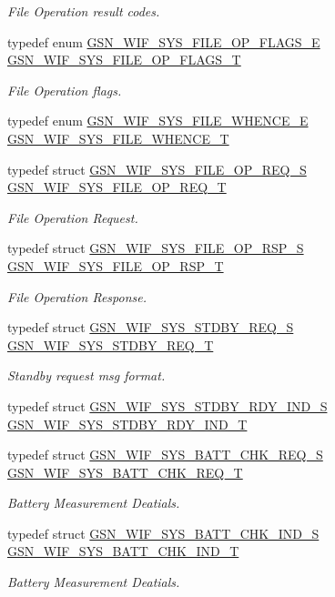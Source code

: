 \begin{DoxyCompactItemize}
\begin{DoxyCompactList}\small\item\em File Operation result codes. \end{DoxyCompactList}\item 
typedef enum \hyperlink{a00639_gac5b276b2a9ea66f27afb0f35e0e75257}{GSN\_\-WIF\_\-SYS\_\-FILE\_\-OP\_\-FLAGS\_\-E} \hyperlink{a00639_ga7719428a1c7dead37acbe115df44fad9}{GSN\_\-WIF\_\-SYS\_\-FILE\_\-OP\_\-FLAGS\_\-T}
\begin{DoxyCompactList}\small\item\em File Operation flags. \end{DoxyCompactList}\item 
typedef enum \hyperlink{a00612_a7df5e29e60c1b277e846cfb371ab25f0}{GSN\_\-WIF\_\-SYS\_\-FILE\_\-WHENCE\_\-E} \hyperlink{a00612_abd4fe8ad19cc5a4a9f488b23b08afbd3}{GSN\_\-WIF\_\-SYS\_\-FILE\_\-WHENCE\_\-T}
\item 
typedef struct \hyperlink{a00350}{GSN\_\-WIF\_\-SYS\_\-FILE\_\-OP\_\-REQ\_\-S} \hyperlink{a00639_ga1808a8f4a69150d0761c6d965d5527d0}{GSN\_\-WIF\_\-SYS\_\-FILE\_\-OP\_\-REQ\_\-T}
\begin{DoxyCompactList}\small\item\em File Operation Request. \end{DoxyCompactList}\item 
typedef struct \hyperlink{a00351}{GSN\_\-WIF\_\-SYS\_\-FILE\_\-OP\_\-RSP\_\-S} \hyperlink{a00639_gace03eed872f0520e74fbcb1eb8faa065}{GSN\_\-WIF\_\-SYS\_\-FILE\_\-OP\_\-RSP\_\-T}
\begin{DoxyCompactList}\small\item\em File Operation Response. \end{DoxyCompactList}\item 
typedef struct \hyperlink{a00364}{GSN\_\-WIF\_\-SYS\_\-STDBY\_\-REQ\_\-S} \hyperlink{a00639_gac5574c4a3e73dabf551d5bdbe8a1c59e}{GSN\_\-WIF\_\-SYS\_\-STDBY\_\-REQ\_\-T}
\begin{DoxyCompactList}\small\item\em Standby request msg format. \end{DoxyCompactList}\item 
typedef struct \hyperlink{a00363}{GSN\_\-WIF\_\-SYS\_\-STDBY\_\-RDY\_\-IND\_\-S} \hyperlink{a00639_ga682020519e40d5d988f8edece8ec693c}{GSN\_\-WIF\_\-SYS\_\-STDBY\_\-RDY\_\-IND\_\-T}
\item 
typedef struct \hyperlink{a00346}{GSN\_\-WIF\_\-SYS\_\-BATT\_\-CHK\_\-REQ\_\-S} \hyperlink{a00639_ga5da12fbc2ff8e811daefb22efe2ea035}{GSN\_\-WIF\_\-SYS\_\-BATT\_\-CHK\_\-REQ\_\-T}
\begin{DoxyCompactList}\small\item\em Battery Measurement Deatials. \end{DoxyCompactList}\item 
typedef struct \hyperlink{a00345}{GSN\_\-WIF\_\-SYS\_\-BATT\_\-CHK\_\-IND\_\-S} \hyperlink{a00639_gad097596826952565d80cccae8d9f10c0}{GSN\_\-WIF\_\-SYS\_\-BATT\_\-CHK\_\-IND\_\-T}
\begin{DoxyCompactList}\small\item\em Battery Measurement Deatials. \end{DoxyCompactList}\end{DoxyCompactItemize}
